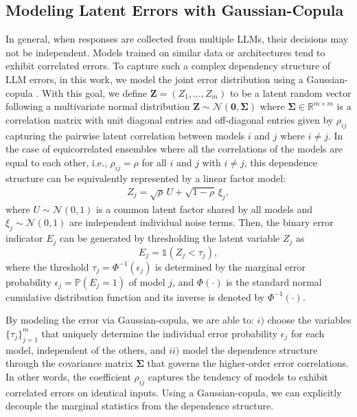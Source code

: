 \documentclass{article}
\theoremstyle{plain}
\theoremstyle{definition}
\theoremstyle{remark}
\begin{document}
\subsection{Modeling Latent Errors with Gaussian-Copula}
\label{subsec:copula_model}
In general, when responses are collected from multiple LLMs, their decisions may not be independent. Models trained on similar data or architectures tend to exhibit correlated errors. To capture such a complex dependency structure of LLM errors, in this work, we model the joint error distribution using a Gaussian-copula \citep{nelsen2007introduction}.
With this goal, we define $\mathbf{Z} = (Z_1, \dots, Z_m)$ to be a latent random vector following a multivariate normal distribution $\mathbf{Z} \sim \mathcal{N}(\mathbf{0}, \mathbf{\Sigma})$ where $\mathbf{\Sigma} \in \mathbb{R}^{m \times m}$ is a correlation matrix with unit diagonal entries and off-diagonal entries given by $\rho_{ij}$ capturing the pairwise latent correlation between models $i$ and $j$ where $i\neq j$. In the case of equicorrelated ensembles where all the correlations of the models are equal to each other, i.e., $\rho_{ij} = \rho$ for all $i$ and $j$ with $i\neq j$, this dependence structure can be equivalently represented by a linear factor model:
\begin{align}
\label{eq:factor_model}
    Z_j = \sqrt{\rho} \, U + \sqrt{1-\rho} \, \xi_j,
\end{align}
where $U \sim \mathcal{N}(0,1)$ is a common latent factor shared by all models and $\xi_j \sim \mathcal{N}(0,1)$ are independent individual noise terms. Then, the binary error indicator $E_j$ can be generated by thresholding the latent variable $Z_j$ as
\begin{equation}
    E_j = \mathds{1}(Z_j < \tau_j),
\end{equation}
where the threshold $\tau_j = \Phi^{-1}(\epsilon_j)$ is determined by the marginal error probability $\epsilon_j = \mathbb{P}(E_j=1)$ of model $j$, and $\Phi(\cdot)$ is the standard normal cumulative distribution function and its inverse is denoted by $\Phi^{-1}(\cdot)$. 

By modeling the error via Gaussian-copula, we are able to: $i)$ choose the variables $\{\!\tau_j\!\}_{\!j=1\!\!}^m$ that uniquely determine the individual error probability $\epsilon_j$ for each model, independent of the others, and $ii)$ model the dependence structure through the covariance matrix $\mathbf{\Sigma}$ that governs the higher-order error correlations. In other words, the coefficient $\rho_{ij}$ captures the tendency of models to exhibit correlated errors on identical inputs. Using a Gaussian-copula, we can explicitly decouple the marginal statistics from the dependence structure. 
\end{document}
